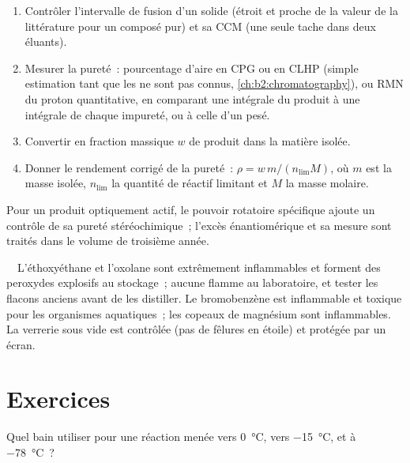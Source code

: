 \begin{method}\label{met:b2:lab-techniques-2:purity}
\begin{enumerate}
  \item Contrôler l'intervalle de fusion d'un solide (étroit et proche de la valeur de la littérature
        pour un composé pur) et sa CCM (une seule tache dans deux éluants).
  \item Mesurer la pureté~: pourcentage d'aire en CPG ou en CLHP (simple estimation tant que les  ne sont pas connus, \cref{ch:b2:chromatography}), ou RMN du proton quantitative, en
        comparant une intégrale du produit à une intégrale de chaque impureté, ou à celle d'un  pesé.
  \item Convertir en fraction massique $w$ de produit dans la matière isolée.
  \item Donner le rendement corrigé de la pureté~: $\rho = w\,m/(n_{\mathrm{lim}}M)$, où $m$ est la
        masse isolée, $n_{\mathrm{lim}}$ la quantité de réactif limitant et $M$ la masse molaire.
\end{enumerate}
\end{method}

Pour un produit optiquement actif, le pouvoir rotatoire spécifique ajoute un contrôle de sa pureté
stéréochimique~; l'excès énantiomérique et sa mesure sont traités dans le volume de troisième année.

\begin{safety}{\,\,\,\,}
L'éthoxyéthane et l'oxolane sont extrêmement inflammables et forment des peroxydes explosifs au
stockage~; aucune flamme au laboratoire, et tester les flacons anciens avant de les distiller. Le
bromobenzène est inflammable et toxique pour les organismes aquatiques~; les copeaux de magnésium sont
inflammables. La verrerie sous vide est contrôlée (pas de fêlures en étoile) et protégée par un écran.
\end{safety}

\section{Exercices}

\begin{exercise}[$\star$]\label{exo:b2:lab-techniques-2:1}
Quel bain utiliser pour une réaction menée vers \qty{0}{\degreeCelsius}, vers
\qty{-15}{\degreeCelsius}, et à \qty{-78}{\degreeCelsius}~?
\end{exercise}

